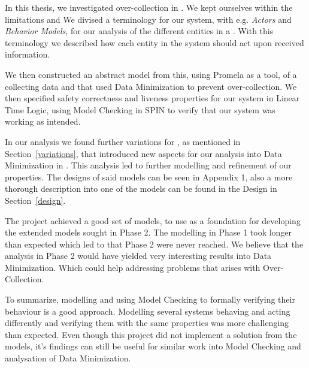 In this thesis, we investigated over-collection in \wsn. We kept ourselves within the limitations and  We divised a terminology for our system, with e.g. \textit{Actors} and \textit{Behavior Models}, for our analysis of the different entities in a \wsn. With this terminology we described how each entity in the system should act upon received information. 

We then constructed an abstract model from this, using Promela as a tool, of a \wsn collecting data and that used Data Minimization to prevent over-collection. We then specified safety correctness and liveness properties for our system in Linear Time Logic, using Model Checking in SPIN to verify that our system was working as intended. 

In our analysis we found further variations for \wsns, as mentioned in Section~\ref{variations}, that introduced new aspects for our analysis into Data Minimization in \wsns. This analysis led to further modelling and refinement of our properties. The designs of said models can be seen in Appendix 1, also a more thorough description into one of the models can be found in the Design in Section~\ref{design}. 

The project achieved a good set of models, to use as a foundation for developing the extended models sought in Phase 2. The modelling in Phase 1 took longer than expected which led to that Phase 2 were never reached. We believe that the analysis in Phase 2 would have yielded very interesting results into Data Minimization. Which could help addressing problems that arises with Over-Collection. 

To summarize, modelling \wsns and using Model Checking to formally verifying their behaviour is a good approach. Modelling several systems behaving and acting differently and verifying them with the same properties was more challenging than expected. Even though this project did not implement a solution from the models, it's findings can still be useful for similar work into Model Checking and analysation of Data Minimization.





